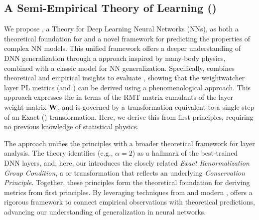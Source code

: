 \subsection{A Semi-Empirical Theory of Learning (\SETOL)}

We propose \SETOL, a \SemiEmpirical Theory for Deep Learning Neural Networks (NNs),
as both a theoretical foundation for \HTSR \Phenomenology
and a novel framework for predicting the properties of complex NN models.
This unified framework offers a deeper understanding of DNN generalization
through a \SemiEmpirical approach inspired by many-body physics,
combined with a classic \STATMECH model for NN generalization.
Specifically, \SETOL combines theoretical and empirical insights to evaluate \ModelQuality,
showing that the weightwatcher layer \HTSR PL metrics (\ALPHA and \ALPHAHAT)
can be derived using a phenomenological \EffectiveHamiltonian approach.
This approach expresses the \HTSR \LayerQuality in terms of the RMT matrix cumulants
of the layer weight matrix ${\mathbf{W}}$,
and is governed by a \ScaleInvariant transformation equivalent
to a single step of an Exact \RenormalizationGroup (\ERG) transformation.
Here, we derive this from first principles, requiring no previous knowledge of statistical physics.

The \SETOL approach unifies the \HTSR principles with
a broader theoretical framework for layer analysis.
The \HTSR theory identifies \Universality (e.g., $\alpha=2$) as a hallmark of the best-trained DNN layers,
and, here, our \SETOL introduces the closely related \emph{Exact Renormalization Group Condition}, a \ScaleInvariant or
\VolumePreserving transformation that reflects an underlying \emph{Conservation Principle}.
Together, these principles form the theoretical foundation for deriving \HTSR \LayerQuality metrics from first principles.
By leveraging techniques from \STATMECH and modern \RMT, \SETOL offers a rigorous framework
to connect empirical observations with theoretical predictions, advancing our understanding of generalization
in neural networks.

